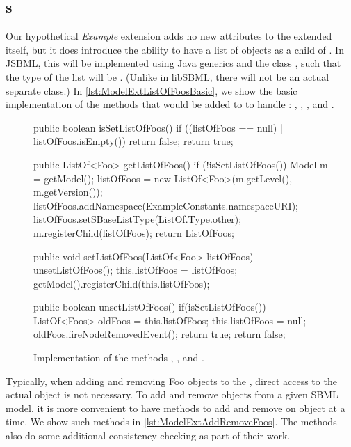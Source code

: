 \subsection{s}
\label{sec:listofs}

Our hypothetical \emph{Example} extension adds no new attributes to the
extended \Model itself, but it does introduce the ability to have a list of
 objects as a child of \Model.  In JSBML, this will be
implemented using Java generics and the class , such that the
type of the list will be .  (Unlike in libSBML, there
will not be an actual separate  class.)  In
\vref{lst:ModelExtListOfFoosBasic}, we show the basic implementation
of the methods that would be added to \Model to handle
: , ,
, and .

\begin{figure}[b]
  \begin{example}[numbers=left]
public boolean isSetListOfFoos() {
  if ((listOfFoos == null) || listOfFoos.isEmpty()) {
    return false;
  }
  return true;
}

public ListOf<Foo> getListOfFoos() {
  if (!isSetListOfFoos()) {
    Model m = getModel();
    listOfFoos = new ListOf<Foo>(m.getLevel(), m.getVersion());
    listOfFoos.addNamespace(ExampleConstants.namespaceURI);
    listOfFoos.setSBaseListType(ListOf.Type.other);
    m.registerChild(listOfFoos);
  }
  return ListOfFoos;
}

public void setListOfFoos(ListOf<Foo> listOfFoos) {
  unsetListOfFoos();
  this.listOfFoos = listOfFoos;
  getModel().registerChild(this.listOfFoos);
}

public boolean unsetListOfFoos() {
  if(isSetListOfFoos()) {
    ListOf<Foos> oldFoos = this.listOfFoos;
    this.listOfFoos = null;
    oldFoos.fireNodeRemovedEvent();
    return true;
  }
  return false;
}\end{example}
  \caption{Implementation of the methods ,
    , and .}
  \label{lst:ModelExtListOfFoosBasic}
\end{figure}

Typically, when adding and removing Foo objects to the \Model, direct
access to the actual  object is not necessary.  To add and
remove  objects from a given SBML model, it is more convenient to
have methods to add and remove on  object at a time.  We show
such methods in \vref{lst:ModelExtAddRemoveFoos}.  The methods also
do some additional consistency checking as part of their work.

